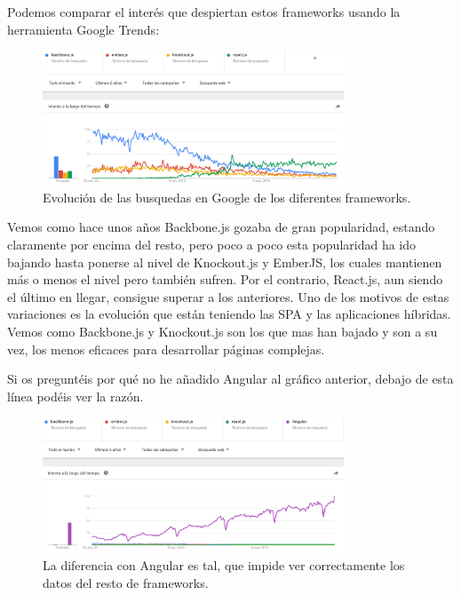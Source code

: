 
Podemos comparar el interés que despiertan estos frameworks usando la herramienta Google Trends:

\begin{figure}[H]
\centering
  \includegraphics[width=0.8\textwidth]{Figures/ch1/frameworks/graph_frameworks_js_wo_angular}
  \caption{Evolución de las busquedas en Google de los diferentes frameworks.}
\end{figure}

Vemos como hace unos años Backbone.js gozaba de gran popularidad, estando claramente por encima del resto, pero  poco a poco esta popularidad ha ido bajando hasta ponerse al nivel de Knockout.js y EmberJS, los cuales mantienen más o menos el nivel pero también sufren. Por el contrario, React.js, aun siendo el último en llegar, consigue superar a los anteriores. Uno de los motivos de estas variaciones es la evolución que están teniendo las \gls{SPA} y las aplicaciones híbridas. Vemos como Backbone.js y Knockout.js son los que mas han bajado y son a su vez, los menos eficaces para desarrollar páginas complejas.

Si os preguntéis por qué no he añadido Angular al gráfico anterior, debajo de esta línea podéis ver la razón.

\begin{figure}[H]
\centering
  \includegraphics[width=0.8\textwidth]{Figures/ch1/frameworks/graph_frameworks_js_w_angular}
  \caption{La diferencia con Angular es tal, que impide ver correctamente los datos del resto de frameworks.}
\end{figure}

